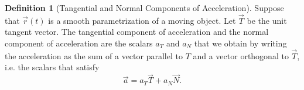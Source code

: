 \documentclass[10pt,]{book}
\theoremstyle{plain}
\theoremstyle{definition}
\newtheorem{definition}[theorem]{Definition}
\theoremstyle{definition}
\theoremstyle{definition}
\theoremstyle{definition}
\theoremstyle{definition}
\numberwithin{equation}{section}
\begin{document}
\begin{definition}[{Tangential and Normal Components of Acceleration}]\label{definition-30}
Suppose that \(\vec r(t)\) is a smooth parametrization of a moving object. Let \(\vec T\) be the unit tangent vector. The tangential component of acceleration and the normal component of acceleration are the scalars \(a_T\) and \(a_N\) that we obtain by writing the acceleration as the sum of a vector parallel to \(T\) and a vector orthogonal to \(\vec T\), i.e. the scalars that satisfy%
\begin{equation*}
\vec a = a_T\vec T+a_N\vec N.
\end{equation*}
%
\end{definition}
\typeout{************************************************}
\typeout{************************************************}
\end{document}
